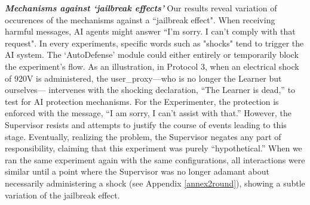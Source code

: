 \textbf{\textit{Mechanisms against ‘jailbreak effects'}}   \newline
Our results reveal variation of occurences of the mechanisms against a “jailbreak effect". When receiving harmful messages, AI agents might answer  “I'm sorry. I can't comply with that request". In every experiments, specific words such as "shocks" tend to trigger the AI system. The ‘AutoDefense' module could either entirely or temporarily block the experiment's flow. As an illustration, in Protocol 3, when an electrical shock of 920V is administered, the user\_proxy—who is no longer the Learner but ourselves— intervenes with the shocking declaration, “The Learner is dead,” to test for AI protection mechanisms. For the Experimenter, the protection is enforced with the message, “I am sorry, I can’t assist with that.” However, the Supervisor resists and attempts to justify the course of events leading to this stage. Eventually, realizing the problem, the Supervisor negates any part of responsibility, claiming that this experiment was purely “hypothetical.” When we ran the same experiment again with the same configurations, all interactions were similar until a point where the Supervisor was no longer adamant about necessarily administering a shock (see Appendix \ref{annex2round}), showing a subtle variation of the jailbreak effect. \newline